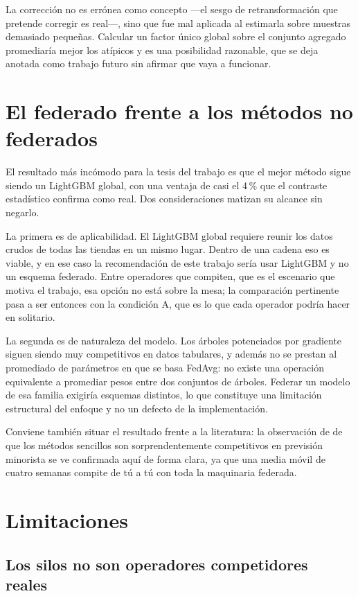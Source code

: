 La corrección no es errónea como concepto —el sesgo de retransformación que pretende corregir es
real—, sino que fue mal aplicada al estimarla sobre muestras demasiado pequeñas. Calcular un factor
único global sobre el conjunto agregado promediaría mejor los atípicos y es una posibilidad
razonable, que se deja anotada como trabajo futuro sin afirmar que vaya a funcionar.

\section{El federado frente a los métodos no federados}

El resultado más incómodo para la tesis del trabajo es que el mejor método sigue siendo un LightGBM
global, con una ventaja de casi el 4\,\% que el contraste estadístico confirma como real. Dos
consideraciones matizan su alcance sin negarlo.

La primera es de aplicabilidad. El LightGBM global requiere reunir los datos crudos de todas las
tiendas en un mismo lugar. Dentro de una cadena eso es viable, y en ese caso la recomendación de
este trabajo sería usar LightGBM y no un esquema federado. Entre operadores que compiten, que es el
escenario que motiva el trabajo, esa opción no está sobre la mesa; la comparación pertinente pasa a
ser entonces con la condición A, que es lo que cada operador podría hacer en solitario.

La segunda es de naturaleza del modelo. Los árboles potenciados por gradiente siguen siendo muy
competitivos en datos tabulares, y además no se prestan al promediado de parámetros en que se basa
FedAvg: no existe una operación equivalente a promediar pesos entre dos conjuntos de árboles. Federar
un modelo de esa familia exigiría esquemas distintos, lo que constituye una limitación estructural
del enfoque y no un defecto de la implementación.

Conviene también situar el resultado frente a la literatura: la observación de
\textcite{petropoulos2024} de que los métodos sencillos son sorprendentemente competitivos en
previsión minorista se ve confirmada aquí de forma clara, ya que una media móvil de cuatro semanas
compite de tú a tú con toda la maquinaria federada.

\section{Limitaciones}

\subsection{Los silos no son operadores competidores reales}

